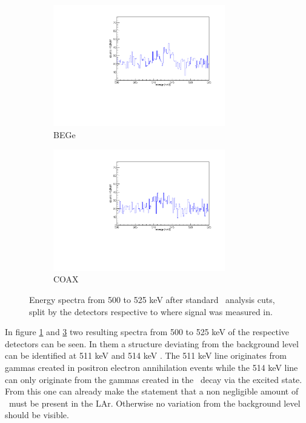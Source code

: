 \documentclass[encoding=utf8,british]{tumphthesis}
\begin{document}
\begin{figure}[t!]
\centering
\begin{subfigure}{.475\textwidth}
  \centering
	\includegraphics[width=75mm]{./Bilder/500525NoFilterBEGes.pdf}

  \caption{BEGe}
    \label{fig:NoFilterBEGes}
\end{subfigure}\hfill%
\begin{subfigure}{.475\textwidth}
  \centering
	\includegraphics[width=75mm]{./Bilder/500525NoFilterCOAX.pdf}
  \caption{COAX}
  \label{fig:NoFilterCOAX}
\end{subfigure}
	\caption{Energy spectra from 500 to 525 keV after standard \gerda\ analysis cuts, split by the detectors respective to where signal was measured in.}
\end{figure}

In figure \ref{fig:NoFilterBEGes} and \ref{fig:NoFilterCOAX} two resulting spectra from 500 to 525 keV of the respective detectors can be seen.
In them a structure deviating from the background level can be identified  at 511 keV and 514 keV .
The 511 keV line originates from gammas created in positron electron annihilation events while the 514 keV line can only originate from the gammas created in the \Kr\ decay via the excited  state.
From this one can already make the statement that a non negligible amount of \Kr\ must be present in the LAr.
Otherwise no variation from the background level should be visible.
\\
\end{document}

